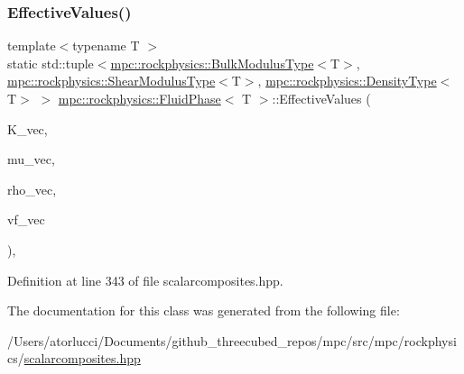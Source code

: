 \subsubsection{\texorpdfstring{Effective\+Values()}{EffectiveValues()}}
{\footnotesize\ttfamily template$<$typename T $>$ \\
static std\+::tuple$<$\mbox{\hyperlink{structmpc_1_1rockphysics_1_1_bulk_modulus_type}{mpc\+::rockphysics\+::\+Bulk\+Modulus\+Type}}$<$T$>$, \mbox{\hyperlink{structmpc_1_1rockphysics_1_1_shear_modulus_type}{mpc\+::rockphysics\+::\+Shear\+Modulus\+Type}}$<$T$>$, \mbox{\hyperlink{structmpc_1_1rockphysics_1_1_density_type}{mpc\+::rockphysics\+::\+Density\+Type}}$<$T$>$ $>$ \mbox{\hyperlink{classmpc_1_1rockphysics_1_1_fluid_phase}{mpc\+::rockphysics\+::\+Fluid\+Phase}}$<$ T $>$\+::Effective\+Values (\begin{DoxyParamCaption}\item[{const std\+::vector$<$ \mbox{\hyperlink{structmpc_1_1rockphysics_1_1_bulk_modulus_type}{mpc\+::rockphysics\+::\+Bulk\+Modulus\+Type}}$<$ T $>$ $>$ \&}]{K\+\_\+vec,  }\item[{const std\+::vector$<$ \mbox{\hyperlink{structmpc_1_1rockphysics_1_1_shear_modulus_type}{mpc\+::rockphysics\+::\+Shear\+Modulus\+Type}}$<$ T $>$ $>$ \&}]{mu\+\_\+vec,  }\item[{const std\+::vector$<$ \mbox{\hyperlink{structmpc_1_1rockphysics_1_1_density_type}{mpc\+::rockphysics\+::\+Density\+Type}}$<$ T $>$ $>$ \&}]{rho\+\_\+vec,  }\item[{const std\+::vector$<$ \mbox{\hyperlink{structmpc_1_1rockphysics_1_1_volume_fraction_type}{mpc\+::rockphysics\+::\+Volume\+Fraction\+Type}}$<$ T $>$ $>$ \&}]{vf\+\_\+vec }\end{DoxyParamCaption})\hspace{0.3cm}{\ttfamily [inline]}, {\ttfamily [static]}}



Definition at line 343 of file scalarcomposites.\+hpp.



The documentation for this class was generated from the following file\+:\begin{DoxyCompactItemize}
\item 
/\+Users/atorlucci/\+Documents/github\+\_\+threecubed\+\_\+repos/mpc/src/mpc/rockphysics/\mbox{\hyperlink{scalarcomposites_8hpp}{scalarcomposites.\+hpp}}\end{DoxyCompactItemize}
